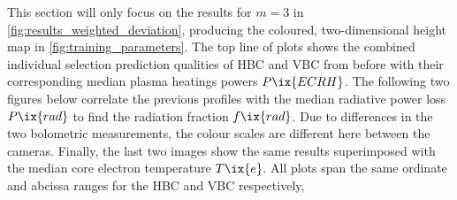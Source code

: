 %
            This section will only focus on the results for $m=3$ in \cref{fig:results_weighted_deviation}, producing the coloured, two-dimensional height map in \cref{fig:training_parameters}. The top line of plots shows the combined individual selection prediction qualities of HBC and VBC from before with their corresponding median plasma heatings powers $P\ix{ECRH}$. The following two figures below correlate the previous profiles with the median radiative power loss $P\ix{rad}$ to find the radiation fraction $f\ix{rad}$. Due to differences in the two bolometric measurements, the colour scales are different here between the cameras. Finally, the last two images show the same results superimposed with the median core electron temperature $T\ix{e}$. All plots span the same ordinate and abcissa ranges for the HBC and VBC respectively,\\%
